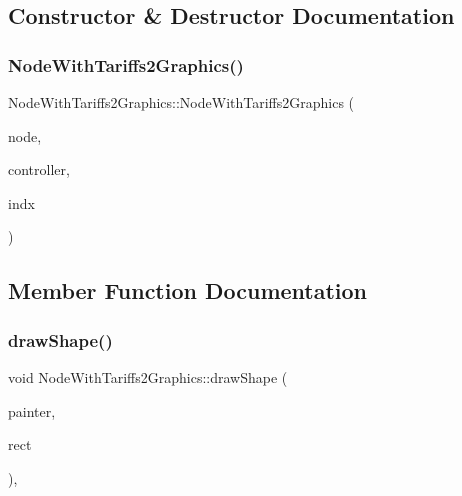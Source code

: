 \subsection{Constructor \& Destructor Documentation}
\mbox{\label{class_node_with_tariffs2_graphics_a953c7c63cbb369d4b33587663c20c7f3}} 
\subsubsection{\texorpdfstring{NodeWithTariffs2Graphics()}{NodeWithTariffs2Graphics()}}
{\footnotesize\ttfamily Node\+With\+Tariffs2\+Graphics\+::\+Node\+With\+Tariffs2\+Graphics (\begin{DoxyParamCaption}\item[{\mbox{\hyperlink{class_node_data}{Node\+Data}} $\ast$}]{node,  }\item[{\mbox{\hyperlink{class_map_objects_controller}{Map\+Objects\+Controller}} $\ast$}]{controller,  }\item[{int}]{indx }\end{DoxyParamCaption})\hspace{0.3cm}{\ttfamily [inline]}}



\subsection{Member Function Documentation}
\mbox{\label{class_node_with_tariffs2_graphics_ab3aad6d1c5b6c5ecb551a199540d8f87}} 
\subsubsection{\texorpdfstring{drawShape()}{drawShape()}}
{\footnotesize\ttfamily void Node\+With\+Tariffs2\+Graphics\+::draw\+Shape (\begin{DoxyParamCaption}\item[{Q\+Painter \&}]{painter,  }\item[{const qmapcontrol\+::\+Rect\+World\+Px \&}]{rect }\end{DoxyParamCaption})\hspace{0.3cm}{\ttfamily [protected]}, {\ttfamily [virtual]}}



